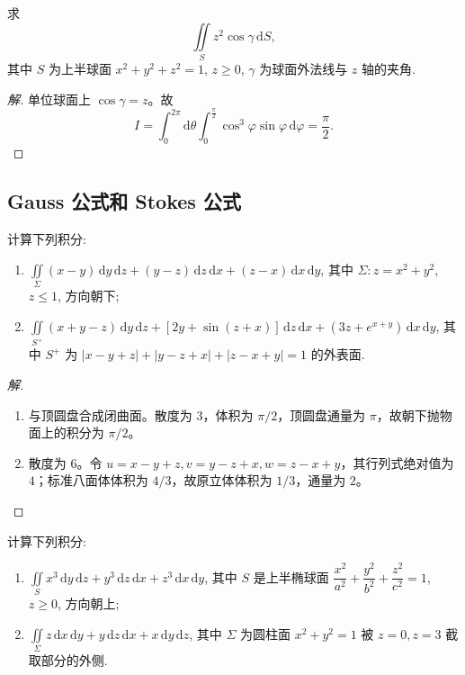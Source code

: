 \documentclass[../../数学分析培优讲义(答案版).tex]{subfiles}
\begin{document}
\begin{example}
求
\[
    \iint\limits_Sz^2\cos\gamma\,\mathrm{d}S,
\]
其中 $S$ 为上半球面 $x^2+y^2+z^2=1$, $z\geq0$, $\gamma$ 为球面外法线与 $z$ 轴的夹角.
\end{example}

\begin{proof}[解]
单位球面上 $\cos\gamma=z$。故
\[
I=\int_0^{2\pi}\!\mathrm{d}\theta\int_0^{\frac{\pi}{2}}\cos^3\varphi\sin\varphi\,\mathrm{d}\varphi=\dfrac{\pi}{2}.
\]
\end{proof}

\subsection{Gauss 公式和 Stokes 公式}

\begin{example}
计算下列积分:
\begin{enumerate}[label=(\arabic*)]
    \item $\displaystyle\iint\limits_\Sigma(x-y)\,\mathrm{d}y\,\mathrm{d}z+(y-z)\,\mathrm{d}z\,\mathrm{d}x+(z-x)\,\mathrm{d}x\,\mathrm{d}y$, 其中 $\Sigma:z=x^2+y^2$, $z\leq1$, 方向朝下;
    \item $\displaystyle\iint\limits_{S^+}(x+y-z)\,\mathrm{d}y\,\mathrm{d}z+[2y+\sin(z+x)]\,\mathrm{d}z\,\mathrm{d}x+(3z+e^{x+y})\,\mathrm{d}x\,\mathrm{d}y$, 其中 $S^+$ 为 $|x-y+z|+|y-z+x|+|z-x+y|=1$ 的外表面.
\end{enumerate}
\end{example}

\begin{proof}[解]
\begin{enumerate}[label=(\arabic*)]
\item 与顶圆盘合成闭曲面。散度为 $3$，体积为 $\pi/2$，顶圆盘通量为 $\pi$，故朝下抛物面上的积分为 $\pi/2$。
\item 散度为 $6$。令
$u=x-y+z,v=y-z+x,w=z-x+y$，其行列式绝对值为 $4$；标准八面体体积为 $4/3$，故原立体体积为 $1/3$，通量为 $2$。
\end{enumerate}
\end{proof}

\begin{example}
计算下列积分:
\begin{enumerate}[label=(\arabic*)]
    \item $\displaystyle\iint\limits_Sx^3\,\mathrm{d}y\,\mathrm{d}z+y^3\,\mathrm{d}z\,\mathrm{d}x+z^3\,\mathrm{d}x\,\mathrm{d}y$, 其中 $S$ 是上半椭球面 $\dfrac{x^2}{a^2}+\dfrac{y^2}{b^2}+\dfrac{z^2}{c^2}=1$, $z\geq0$, 方向朝上;
    \item $\displaystyle\iint\limits_\Sigma z\,\mathrm{d}x\,\mathrm{d}y+y\,\mathrm{d}z\,\mathrm{d}x+x\,\mathrm{d}y\,\mathrm{d}z$, 其中 $\Sigma$ 为圆柱面 $x^2+y^2=1$ 被 $z=0,z=3$ 截取部分的外侧.
\end{enumerate}
\end{example}
\end{document}
